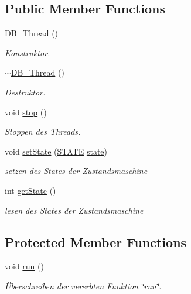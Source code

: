 \subsection*{Public Member Functions}
\begin{CompactItemize}
\item 
\hyperlink{class_d_b___thread_a46c43472b35bc30b885da7adb2ec480}{DB\_\-Thread} ()
\begin{CompactList}\small\item\em Konstruktor. \item\end{CompactList}\item 
\hyperlink{class_d_b___thread_3c4f9d073814887a717de180b2e8e6b9}{$\sim$DB\_\-Thread} ()
\begin{CompactList}\small\item\em Destruktor. \item\end{CompactList}\item 
void \hyperlink{class_d_b___thread_e468157edacaa0760e833bf643371e62}{stop} ()
\begin{CompactList}\small\item\em Stoppen des Threads. \item\end{CompactList}\item 
void \hyperlink{class_d_b___thread_5ca406169a78d0e196a7cb57aae01a30}{setState} (\hyperlink{class_d_b___thread_a70b1b8bfaf0d6b88c1284b947234b5e}{STATE} \hyperlink{class_d_b___thread_9b38f026919bb5a09dd2e8af8e0feef7}{state})
\begin{CompactList}\small\item\em setzen des States der Zustandsmaschine \item\end{CompactList}\item 
int \hyperlink{class_d_b___thread_01d2131117426b8f76c3aacb901f6de7}{getState} ()
\begin{CompactList}\small\item\em lesen des States der Zustandsmaschine \item\end{CompactList}\end{CompactItemize}
\subsection*{Protected Member Functions}
\begin{CompactItemize}
\item 
void \hyperlink{class_d_b___thread_bb50ad9355d7353eab556833a59e49e0}{run} ()
\begin{CompactList}\small\item\em Überschreiben der vererbten Funktion \char`\"{}run\char`\"{}. \item\end{CompactList}\end{CompactItemize}

